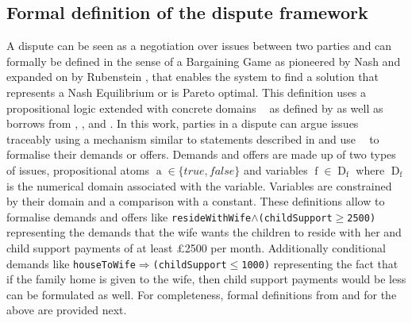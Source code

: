 \documentclass[12pt,msc,a4paper,oneside]{ucl_thesis}
\DeclareMathOperator{\Proplang}{\mathcal{L}(N)}
\DeclareMathOperator{\propatom}{a}
\DeclareMathOperator{\propvar}{f}
\DeclareMathOperator{\Propdom}{D}
\begin{document}
\subsection{Formal definition of the dispute framework} \label{sec:formalising_dispute}
A dispute can be seen as a negotiation over issues between two parties and can formally be defined in the sense of a Bargaining Game as pioneered by Nash \cite{Nash:bargaining} and expanded on by Rubenstein \cite{Rubenstein}, that enables the system to find a solution that represents a Nash Equilibrium or is Pareto optimal. This definition uses a propositional logic extended with concrete domains $\Proplang$ as defined by \cite{Ragone2008} as well as borrows from \cite{Lodder:ORD_system_design}, \cite{DBLP:journals:corr:ZhangZ14a}, \cite{Bellucci:2004:IAI:1032651.1033678} and \cite{Hemaissia:2007:MMN:1329125.1329314}.
In this work, parties in a dispute can argue issues traceably using a mechanism similar to statements described in \cite{Bellucci:2004:IAI:1032651.1033678} and use $\Proplang$ to formalise their demands or offers. Demands and offers are made up of two types of issues, propositional atoms $\propatom \in \{true, false\}$ and variables $\propvar \in \Propdom_{\propvar}$ where $\Propdom_{\propvar}$ is the numerical domain associated with the variable. Variables are constrained by their domain and a comparison with a constant. These definitions allow to formalise demands and offers like \texttt{resideWithWife$\wedge$(childSupport$\geq$2500)} representing the demands that the wife wants the children to reside with her and child support payments of at least £2500 per month. Additionally conditional demands like \texttt{houseToWife$\Rightarrow$(childSupport$\leq$1000)} representing the fact that if the family home is given to the wife, then child support payments would be less can be formulated as well. For completeness, formal definitions from \cite{Ragone2008} and \cite{Baader:1991:SIC:1631171.1631239} for the above are provided next.
\end{document}
